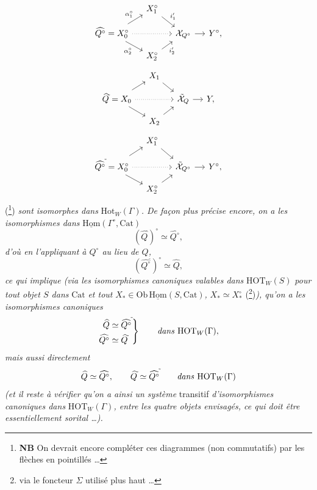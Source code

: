 \documentclass[11pt]{article}
\newcommand{\printedpage}[1]{\marginpar{\footnotesize p.~#1}}
\newcommand{\msp}[1]{\marginpar{\footnotesize [#1]}}
\newcommand{\Hot}{\mathrm{Hot}}
\newcommand{\HOT}{\mathrm{HOT}}
\newcommand{\Cat}{\mathrm{Cat}}
\newcommand{\uHom}{\underline{\mathrm{Hom}}}
\newcommand{\tld}{^{\tilde{}}}
\begin{document}
\setcounter{footnote}{90}

\printedpage{98}
\[
\begin{tikzcd}[row sep=small, column sep=small]
 & X_1^\circ \arrow[dr,"i^{\prime}_{1}"] & & \\
\widehat{Q^\circ} = X_0^\circ \arrow[ur,"\alpha_1^\circ"] \arrow[dr,"\alpha_2^\circ"'] \arrow[rr,dotted] & & \mathcal{X}_{Q^\circ} \arrow[r] & Y^\circ, \\
 & X_2^\circ \arrow[ur,"i^{\prime}_{2}"'] & &
\end{tikzcd}
\]
\[
\begin{tikzcd}[row sep=small, column sep=small]
 & X_1 \arrow[dr] & & \\
\widehat{Q}\tld = X_0 \arrow[ur] \arrow[dr] \arrow[rr,dotted] & & \tilde{\mathcal{X}}_{Q} \arrow[r] & Y, \\
 & X_2 \arrow[ur] & &
\end{tikzcd}
\]
\[
\begin{tikzcd}[row sep=small, column sep=small]
 & X_1^\circ \arrow[dr] & & \\
\widehat{Q^\circ}\tld = X_0^\circ \arrow[ur] \arrow[dr] \arrow[rr,dotted] & & \tilde{\mathcal{X}}_{Q^\circ} \arrow[r] & Y^\circ, \\
 & X_2^\circ \arrow[ur] & &
\end{tikzcd}
\]
(\footnote{\textbf{NB} On devrait encore compléter ces diagrammes (non commutatifs) par les flèches en pointillés \dots}) \textit{sont isomorphes dans} $\Hot_W(\Gamma)$\textit{. De façon plus précise encore, on a les isomorphismes dans} $\uHom(\Gamma^\circ,\Cat)$
\[
(\widehat{Q}\tld)^\circ \simeq \widehat{Q^\circ},
\]
\textit{d'où en l'appliquant à $Q^\circ$ au lieu de $Q$,}
\[
(\widehat{Q^\circ}\tld)^\circ \simeq \widehat{Q},
\]
\textit{ce qui implique (via les isomorphismes canoniques valables dans} $\HOT_W(S)$ \textit{pour tout objet $S$ dans} $\Cat$ \textit{et tout} $X_* \in \mathrm{Ob}\,\uHom(S,\Cat)$\textit{,} $X_* \simeq X_*^\circ$ (\footnote{via le foncteur $\Sigma$ utilisé plus haut \dots})\textit{), qu'on a les isomorphismes canoniques}
\[
\left.\begin{aligned}
\widehat{Q} &\simeq \widehat{Q^\circ}\tld \\
\widehat{Q^\circ} &\simeq \widehat{Q}\tld
\end{aligned}\right\}
\qquad \text{\textit{dans} } \HOT_W(\Gamma),
\]
\textit{mais aussi directement}
\[
\widehat{Q} \simeq \widehat{Q^\circ}, \qquad \widehat{Q}\tld \simeq \widehat{Q^\circ}\tld \qquad \text{\textit{dans} } \HOT_W(\Gamma)
\]
\msp{page 143}\textit{(et il reste à vérifier qu'on a ainsi un système} transitif \textit{d'isomorphismes canoniques dans} $\HOT_W(\Gamma)$\textit{, entre les quatre objets envisagés, ce qui doit être essentiellement sorital \dots).}
\end{document}
